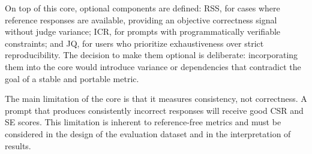 \documentclass[11pt,a4paper]{article}
\begin{document}
On top of this core, optional components are defined: RSS, for cases where reference responses are available, providing an objective correctness signal without judge variance; ICR, for prompts with programmatically verifiable constraints; and JQ, for users who prioritize exhaustiveness over strict reproducibility. The decision to make them optional is deliberate: incorporating them into the core would introduce variance or dependencies that contradict the goal of a stable and portable metric.

The main limitation of the core is that it measures consistency, not correctness. A prompt that produces consistently incorrect responses will receive good CSR and SE scores. This limitation is inherent to reference-free metrics and must be considered in the design of the evaluation dataset and in the interpretation of results.



\end{document}
